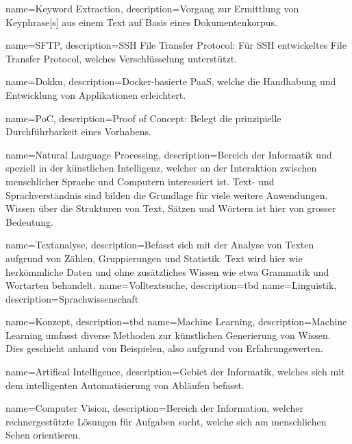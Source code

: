 {
    name=Keyword Extraction,
    description={Vorgang zur Ermittlung von \gls{Keyphrase}[s] aus einem Text auf Basis eines Dokumentenkorpus.}
}

{
    name=SFTP,
    description={SSH File Transfer Protocol: Für SSH entwickeltes File Transfer Protocol, welches Verschlüsselung unterstützt.}
}

{
    name=Dokku,
    description={Docker-basierte PaaS, welche die Handhabung und Entwicklung von Applikationen erleichtert.}
}

{
    name=PoC,
    description={Proof of Concept: Belegt die prinzipielle Durchführbarkeit eines Vorhabens.}
}

{
    name=Natural Language Processing,
    description={Bereich der Informatik und speziell in der künstlichen Intelligenz, welcher an der Interaktion zwischen menschlicher Sprache und Computern interessiert ist. Text- und Sprachverständnis sind bilden die Grundlage für viele weitere Anwendungen. Wissen über die Strukturen von Text, Sätzen und Wörtern ist hier von grosser Bedeutung.}
}

{
    name=Textanalyse,
    description={Befasst sich mit der Analyse von Texten aufgrund von Zählen, Gruppierungen und Statistik. Text wird hier wie herkömmliche Daten und ohne zusätzliches Wissen wie etwa Grammatik und Wortarten behandelt.}
}
{
    name=Volltextsuche,
    description={tbd}
}
{
    name=Linguistik,
    description={Sprachwissenschaft}
}

{
    name=Konzept,
    description={tbd}
}
{
    name=Machine Learning,
    description={Machine Learning umfasst diverse Methoden zur künstlichen Generierung von Wissen. Dies geschieht anhand von Beispielen, also aufgrund von Erfahrungswerten.}
}

{
    name=Artifical Intelligence,
    description={Gebiet der Informatik, welches sich mit dem intelligenten Automatisierung von Abläufen befasst.}
}

{
    name=Computer Vision,
    description={Bereich der Information, welcher rechnergestützte Lösungen für Aufgaben sucht, welche sich am menschlichen Sehen orientieren.}
}

